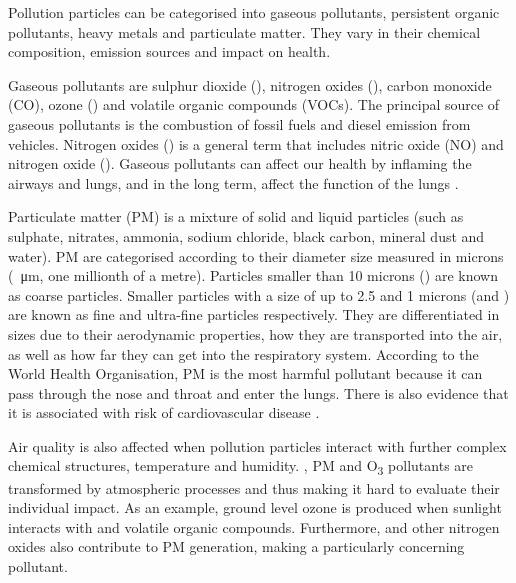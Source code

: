 Pollution particles can be categorised into gaseous pollutants, persistent organic pollutants, heavy metals and particulate matter. They vary in their chemical composition, emission sources and impact on health. 

Gaseous pollutants are sulphur dioxide (\SOTWO), nitrogen oxides (\NOX), carbon monoxide (CO), ozone (\OTHREE) and volatile organic compounds (VOCs). The principal source of gaseous pollutants is the combustion of fossil fuels and diesel emission from vehicles. Nitrogen oxides (\NOX) is a general term that includes nitric oxide (NO) and nitrogen oxide (\NOTWO). Gaseous pollutants can affect our health by inflaming the airways and lungs, and in the long term, affect the function of the lungs \cite{AirQualityExpertGroup2004} \cite{WHO2003}.

Particulate matter (PM) is a mixture of solid and liquid particles (such as sulphate, nitrates, ammonia, sodium chloride, black carbon, mineral dust and water). PM are categorised according to their diameter size measured in microns (\SI{}{\micro\metre}, one millionth of a metre). Particles smaller than 10 microns (\PMTEN) are known as coarse particles. Smaller particles with a size of up to 2.5 and 1 microns (\PMTWO and \PMONE) are known as fine and ultra-fine particles respectively. They are differentiated in sizes due to their aerodynamic properties, how they are transported into the air, as well as how far they can get into the respiratory system. According to the World Health Organisation, PM is the most harmful pollutant because it can pass through the nose and throat and enter the lungs. There is also evidence that it is associated with risk of cardiovascular disease \cite{Polichetti2009}. 

Air quality is also affected when pollution particles interact with further complex chemical structures, temperature and humidity. \NOTWO, PM and O\textsubscript{3}  pollutants are transformed by atmospheric processes and thus making it hard to evaluate their individual impact. As an example, ground level ozone is produced when sunlight interacts with \NOTWO and volatile organic compounds. Furthermore, \NOTWO and other nitrogen oxides also contribute to PM generation, making \NOX a particularly concerning pollutant.


